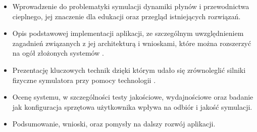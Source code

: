 \begin{itemize}
\item Wprowadzenie do problematyki symulacji dynamiki płynów i przewodnictwa
cieplnego, jej znaczenie dla edukacji oraz przegląd istniejących rozwiązań.

\item Opis podstawowej implementacji aplikacji, ze szczególnym uwzględnieniem
zagadnień związanych z jej architekturą i wnioskami, które można rozszerzyć na
ogół złożonych systemów .

\item Prezentację kluczowych technik dzięki którym udało się zrównoleglić
silniki fizyczne symulatora przy pomocy technologii .

\item Ocenę systemu, w szczególności testy jakościowe, wydajnościowe oraz
badanie jak konfiguracja sprzętowa użytkownika wpływa na odbiór i jakość
symulacji.

\item Podsumowanie, wnioski, oraz pomysły na dalszy rozwój aplikacji.
\end{itemize}
